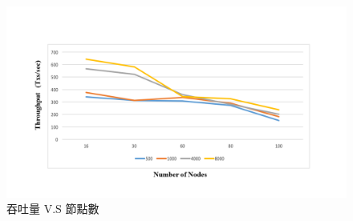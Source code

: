 \begin{figure}[htp]
\centering
\includegraphics[scale=0.5]{images/63.png}
\caption{吞吐量 V.S 節點數}
\label{i:byz-latency}
\end{figure}
